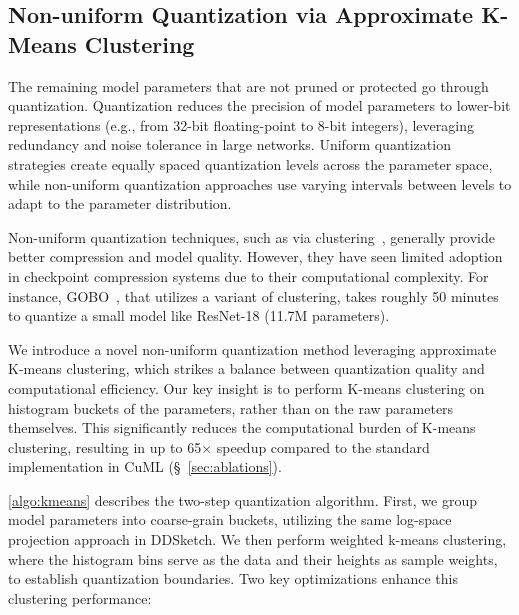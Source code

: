 



\subsection{Non-uniform Quantization via Approximate K-Means Clustering}
\label{sec:nonuniform}
The remaining model parameters that are not pruned or protected go through quantization. 
Quantization reduces the precision of model parameters to lower-bit representations (e.g., from 32-bit floating-point to 8-bit integers), leveraging redundancy and noise tolerance in large networks. Uniform quantization strategies create equally spaced quantization levels across the parameter space, while non-uniform quantization approaches use varying intervals between levels to adapt to the parameter distribution. 

Non-uniform quantization techniques, such as via \kmeans clustering~\cite{checknrun, gobo, deep-compression}, generally provide better compression and model quality. However, they have seen limited adoption in checkpoint compression systems due to their computational complexity. For instance, GOBO~\cite{gobo}, that utilizes a variant of \kmeans clustering, takes roughly 50 minutes to quantize a small model like ResNet-18 (11.7M parameters).




We introduce a novel non-uniform quantization method leveraging approximate K-means clustering, which strikes a balance between quantization quality and computational efficiency. Our key insight is to perform K-means clustering on histogram buckets of the parameters, rather than on the raw parameters themselves. This significantly reduces the computational burden of K-means clustering, resulting in up to 65$\times$ speedup compared to the standard implementation in CuML (\S~\ref{sec:ablations}). 



\cref{algo:kmeans} describes the two-step quantization algorithm. First, we group model parameters into coarse-grain buckets, utilizing the same log-space projection approach in DDSketch. We then perform weighted k-means clustering, where the histogram bins serve as the data and their heights as sample weights, to establish quantization boundaries. Two key optimizations enhance this clustering performance:




